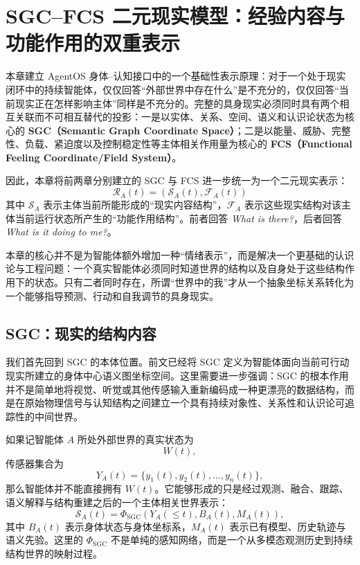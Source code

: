\chapter{SGC--FCS 二元现实模型：经验内容与功能作用的双重表示}

\begin{chapterlead}
本章建立 AgentOS 身体--认知接口中的一个基础性表示原理：对于一个处于现实闭环中的持续智能体，仅仅回答“外部世界中存在什么”是不充分的，仅仅回答“当前现实正在怎样影响主体”同样是不充分的。完整的具身现实必须同时具有两个相互关联而不可相互替代的投影：一是以实体、关系、空间、语义和认识论状态为核心的 \textbf{SGC（Semantic Graph Coordinate Space）}；二是以能量、威胁、完整性、负载、紧迫度以及控制稳定性等主体相关作用量为核心的 \textbf{FCS（Functional Feeling Coordinate/Field System）}。

因此，本章将前两章分别建立的 SGC 与 FCS 进一步统一为一个二元现实表示：
\[
\boxed{
\mathcal R_A(t)
=
\left(
\mathcal S_A(t),
\mathcal F_A(t)
\right)
}
\]
其中 $\mathcal S_A$ 表示主体当前所能形成的“现实内容结构”，$\mathcal F_A$ 表示这些现实结构对该主体当前运行状态所产生的“功能作用结构”。前者回答 \emph{What is there?}，后者回答 \emph{What is it doing to me?}。

本章的核心并不是为智能体额外增加一种“情绪表示”，而是解决一个更基础的认识论与工程问题：一个真实智能体必须同时知道世界的结构以及自身处于这些结构作用下的状态。只有二者同时存在，所谓“世界中的我”才从一个抽象坐标关系转化为一个能够指导预测、行动和自我调节的具身现实。
\end{chapterlead}




\section{SGC：现实的结构内容}

我们首先回到 SGC 的本体位置。前文已经将 SGC 定义为智能体面向当前可行动现实所建立的身体中心语义图坐标空间。这里需要进一步强调：SGC 的根本作用并不是简单地将视觉、听觉或其他传感输入重新编码成一种更漂亮的数据结构，而是在原始物理信号与认知结构之间建立一个具有持续对象性、关系性和认识论可追踪性的中间世界。

如果记智能体 $A$ 所处外部世界的真实状态为
\[
W(t),
\]
传感器集合为
\[
Y_A(t)=\{y_1(t),y_2(t),\ldots,y_n(t)\},
\]
那么智能体并不能直接拥有 $W(t)$。它能够形成的只是经过观测、融合、跟踪、语义解释与结构重建之后的一个主体相关世界表示：
\[
\mathcal S_A(t)
=
\Phi_{\mathrm{SGC}}
\left(
Y_A(\leq t),
B_A(t),
M_A(t)
\right),
\]
其中 $B_A(t)$ 表示身体状态与身体坐标系，$M_A(t)$ 表示已有模型、历史轨迹与语义先验。这里的 $\Phi_{\mathrm{SGC}}$ 不是单纯的感知网络，而是一个从多模态观测历史到持续结构世界的映射过程。

